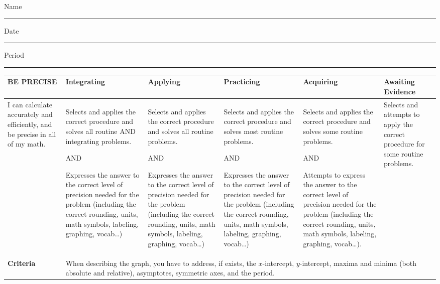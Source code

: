 \documentclass[10pt]{article}
\title{}
\date{}
\begin{document}
\noindent
{\large
Name \rule{16em}{.5pt} Date \rule{8em}{.5pt} Period \rule{2em}{.5pt}
}
\vspace{1em}

\begingroup
\renewcommand{\arraystretch}{1.5}
\begin{center}
{\footnotesize
\begin{tabularx}{\textwidth}{|X|X|X|X|X|X|}
\hline
\bf BE PRECISE & \centerline{Integrating} & \centerline{Applying} & \centerline{Practicing} & \centerline{Acquiring} & \centerline{Awaiting Evidence} \\
\hline
I can calculate accurately and efficiently, and be precise in all of my math.&
Selects and applies the correct procedure and solves all routine AND integrating problems.

AND

Expresses the answer to the correct level of precision needed for the problem (including the correct rounding, units, math symbols, labeling, graphing, vocab…)
&Selects and applies the correct procedure and solves all routine problems.


AND

Expresses the answer to the correct level of precision needed for the problem (including the correct rounding, units, math symbols, labeling, graphing, vocab…)
&Selects and applies the correct procedure and solves most routine problems.


AND

Expresses the answer to the correct level of precision needed for the problem (including the correct rounding, units, math symbols, labeling, graphing, vocab…)
&Selects and applies the correct procedure and solves some routine problems.


AND

Attempts to express the answer to the correct level of precision needed for the problem (including the correct rounding, units, math symbols, labeling, graphing, vocab…).
&Selects and attempts to apply the correct procedure for some routine problems.\\
\hline
\bf Criteria&\multicolumn{5}{l|}{\parbox[c][4em]{.8\textwidth}{When describing the graph, you have to address, if exists, the $x$-intercept, $y$-intercept, maxima and minima (both absolute and relative), asymptotes, symmetric axes, and the period.}}\\
\hline
\end{tabularx}
}
\end{center}
\endgroup
\vspace{2em}
\end{document}
